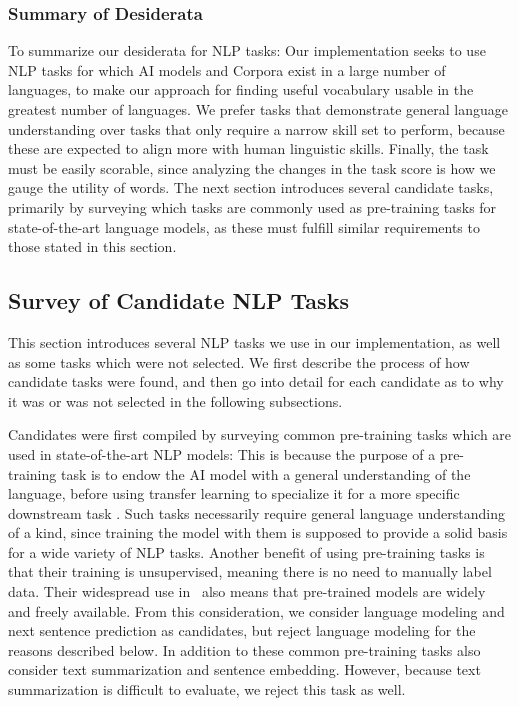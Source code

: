 \subsubsection{Summary of Desiderata}
To summarize our desiderata for NLP tasks:
Our implementation seeks to use NLP tasks for which AI models and Corpora exist in a large number of languages, to make our approach for finding useful vocabulary usable in the greatest number of languages.
We prefer tasks that demonstrate general language understanding over tasks that only require a narrow skill set to perform, because these are expected to align more with human linguistic skills.
Finally, the task must be easily scorable, since analyzing the changes in the task score is how we gauge the utility of words.
The next section introduces several candidate tasks, primarily by surveying which tasks are commonly used as pre-training tasks for state-of-the-art language models, as these must fulfill similar requirements to those stated in this section.

\subsection{Survey of Candidate NLP Tasks} \label{sec:candiate-tasks-survey}
This section introduces several NLP tasks we use in our implementation, as well as some tasks which were not selected.
We first describe the process of how candidate tasks were found, and then go into detail for each candidate as to why it was or was not selected in the following subsections.

Candidates were first compiled by surveying common pre-training tasks which are used in state-of-the-art NLP models:
This is because the purpose of a pre-training task is to endow the AI model with a general understanding of the language, before using transfer learning to specialize it for a more specific downstream task \cite{jurafskySpeechLanguageProcessing2025a}.
Such tasks necessarily require general language understanding of a kind, since training the model with them is supposed to provide a solid basis for a wide variety of NLP tasks.
Another benefit of using pre-training tasks is that their training is unsupervised, meaning there is no need to manually label data.
Their widespread use in \NLP\ also means that pre-trained models are widely and freely available.
From this consideration, we consider language modeling and next sentence prediction as candidates, but reject language modeling for the reasons described below.
In addition to these common pre-training tasks also consider text summarization and sentence embedding.
However, because text summarization is difficult to evaluate, we reject this task as well.

